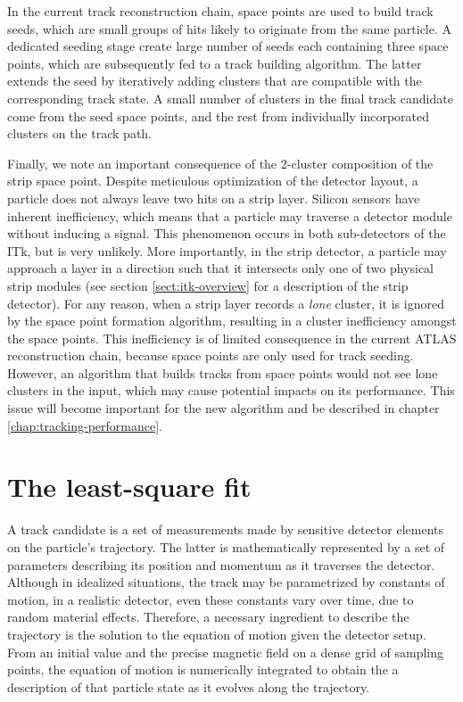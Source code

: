 
In the current track reconstruction chain, space points are used to build track seeds, which are small groups of hits likely to originate from the same particle. 
A dedicated seeding stage create large number of seeds each containing three space points, which are subsequently fed to a track building algorithm. 
The latter extends the seed by iteratively adding clusters that are compatible with the corresponding track state.
A small number of clusters in the final track candidate come from the seed space points, and the rest from individually incorporated clusters on the track path.

Finally, we note an important consequence of the 2-cluster composition of the strip space point.
Despite meticulous optimization of the detector layout, a particle does not always leave two hits on a strip layer. 
Silicon sensors have inherent inefficiency, which means that a particle may traverse a detector module without inducing a signal.
This phenomenon occurs in both sub-detectors of the ITk, but is very unlikely.
More importantly, in the strip detector, a particle may approach a layer in a direction such that it intersects only one of two physical strip modules (see section \ref{sect:itk-overview} for a description of the strip detector). 
For any reason, when a strip layer records a \textit{lone} cluster, it is ignored by the space point formation algorithm, resulting in a cluster inefficiency amongst the space points.
This inefficiency is of limited consequence in the current ATLAS reconstruction chain, because space points are only used for track seeding.
However, an algorithm that builds tracks from space points would not see lone clusters in the input, which may cause potential impacts on its performance.
This issue will become important for the new algorithm and be described in chapter \ref{chap:tracking-performance}.

\section{The least-square fit}
\label{sect:track-fit}

A track candidate is a set of measurements made by sensitive detector elements on the particle's trajectory. 
The latter is mathematically represented by a set of parameters describing its position and momentum as it traverses the detector. 
Although in idealized situations, the track may be parametrized by constants of motion, in a realistic detector, even these constants vary over time, due to random material effects. 
Therefore, a necessary ingredient to describe the trajectory is the solution to the equation of motion given the detector setup. 
From an initial value and the precise magnetic field on a dense grid of sampling points, the equation of motion is numerically integrated to obtain the a description of that particle state as it evolves along the trajectory. 

